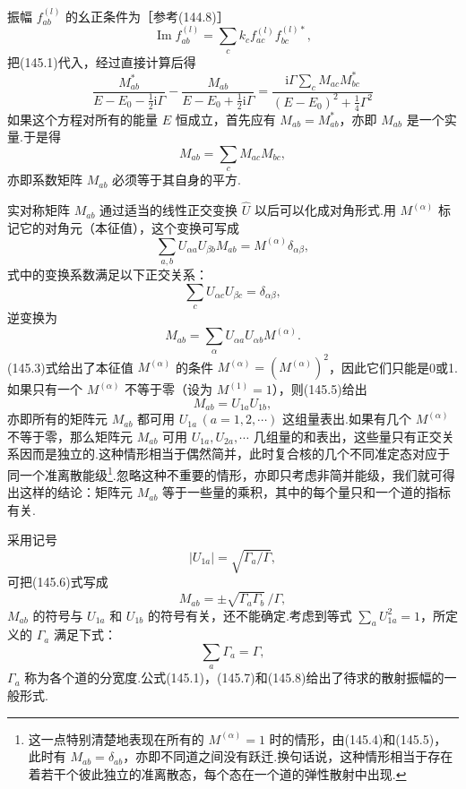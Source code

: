 振幅 $f_{ab}^{(l)}$ 的幺正条件为［参考(144.8)］
\begin{equation}
  \operatorname{Im}f_{ab}^{(l)}=\sum_ck_cf_{ac}^{(l)}f_{bc}^{(l)*},
\end{equation}
把(145.1)代入，经过直接计算后得
\begin{equation*}
  \frac{M_{ab}^{*}}{E-E_0-\frac{1}{2}\mathrm{i}\Gamma}
  -\frac{M_{ab}}{E-E_0+\frac{1}{2}\mathrm{i}\Gamma}
  =\frac{\mathrm{i}\Gamma\sum_cM_{ac}M_{bc}^{*}}
  {(E-E_0)^2+\frac{1}{4}\Gamma^2}
\end{equation*}
如果这个方程对所有的能量 $E$ 恒成立，首先应有 $M_{ab}=M_{ab}^{*}$，亦即 $M_{ab}$ 是一个实量.于是得
\begin{equation}
  M_{ab}=\sum_cM_{ac}M_{bc},
\end{equation}
亦即系数矩阵 $M_{ab}$ 必须等于其自身的平方.

实对称矩阵 $M_{ab}$ 通过适当的线性正交变换 $\hat{U}$ 以后可以化成对角形式.用 $M^{(\alpha)}$ 标记它的对角元（本征值），这个变换可写成
\begin{equation*}
  \sum_{a,b}U_{\alpha a}U_{\beta b}M_{ab}=M^{(\alpha)}\delta_{\alpha\beta},
\end{equation*}
式中的变换系数满足以下正交关系：
\begin{equation}
  \sum_cU_{\alpha c}U_{\beta c}=\delta_{\alpha\beta},
\end{equation}
逆变换为
\begin{equation}
  M_{ab}=\sum_{\alpha}U_{\alpha a}U_{\alpha b}M^{(\alpha)}.
\end{equation}
(145.3)式给出了本征值 $M^{(\alpha)}$ 的条件 $M^{(\alpha)}=\left(M^{(\alpha)}\right)^2$，因此它们只能是0或1.如果只有一个 $M^{(\alpha)}$ 不等于零（设为 $M^{(1)}=1$），则(145.5)给出
\begin{equation}
  M_{ab}=U_{1a}U_{1b},
\end{equation}
亦即所有的矩阵元 $M_{ab}$ 都可用 $U_{1a}\,(a=1,2,\cdots)$ 这组量表出.如果有几个 $M^{(\alpha)}$ 不等于零，那么矩阵元 $M_{ab}$ 可用 $U_{1a},U_{2a},\cdots$ 几组量的和表出，这些量只有正交关系因而是独立的.这种情形相当于偶然简并，此时复合核的几个不同准定态对应于同一个准离散能级\footnote{这一点特别清楚地表现在所有的 $M^{(\alpha)}=1$ 时的情形，由(145.4)和(145.5)，此时有 $M_{ab}=\delta_{ab}$，亦即不同道之间没有跃迁.换句话说，这种情形相当于存在着若干个彼此独立的准离散态，每个态在一个道的弹性散射中出现.}.忽略这种不重要的情形，亦即只考虑非简并能级，我们就可得出这样的结论：矩阵元 $M_{ab}$ 等于一些量的乘积，其中的每个量只和一个道的指标有关.

采用记号
\begin{equation*}
  |U_{1a}|=\sqrt{\Gamma_a/\Gamma},
\end{equation*}
可把(145.6)式写成
\begin{equation}
  M_{ab}=\pm\sqrt{\Gamma_a\Gamma_b}\,/\Gamma,
\end{equation}
$M_{ab}$ 的符号与 $U_{1a}$ 和 $U_{1b}$ 的符号有关，还不能确定.考虑到等式 $\sum_aU_{1a}^2=1$，所定义的 $\Gamma_a$ 满足下式：
\begin{equation}
  \sum_a\Gamma_a=\Gamma,
\end{equation}
$\Gamma_a$ 称为各个道的分宽度.公式(145.1)，(145.7)和(145.8)给出了待求的散射振幅的一般形式.

